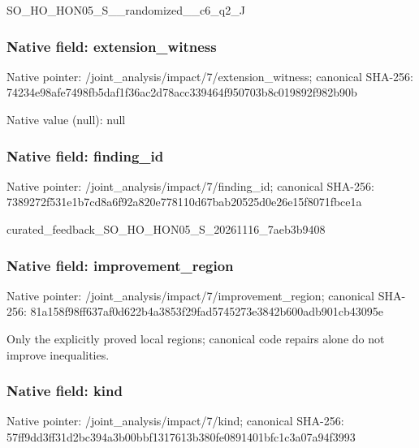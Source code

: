 \documentclass[10pt,a4paper]{article}
\begin{document}
\begingroup\raggedright\sloppy SO\_\allowbreak{}HO\_\allowbreak{}HON05\_\allowbreak{}S\_\allowbreak{}\_\allowbreak{}randomized\_\allowbreak{}\_\allowbreak{}c6\_\allowbreak{}q2\_\allowbreak{}J\par\endgroup

\subsubsection{Native field: extension\_\allowbreak{}witness}
Native pointer: /joint\_\allowbreak{}analysis/impact/7/extension\_\allowbreak{}witness; canonical SHA-256: 74234e98afe7498fb5daf1f36ac2d78acc339464f950703b8c019892f982b90b

Native value (null): null

\subsubsection{Native field: finding\_\allowbreak{}id}
Native pointer: /joint\_\allowbreak{}analysis/impact/7/finding\_\allowbreak{}id; canonical SHA-256: 7389272f531e1b7cd8a6f92a820e778110d67bab20525d0e26e15f8071fbce1a

\begingroup\raggedright\sloppy curated\_\allowbreak{}feedback\_\allowbreak{}SO\_\allowbreak{}HO\_\allowbreak{}HON05\_\allowbreak{}S\_\allowbreak{}20261116\_\allowbreak{}7aeb3b9408\par\endgroup

\subsubsection{Native field: improvement\_\allowbreak{}region}
Native pointer: /joint\_\allowbreak{}analysis/impact/7/improvement\_\allowbreak{}region; canonical SHA-256: 81a158f98ff637af0d622b4a3853f29fad5745273e3842b600adb901cb43095e

\begingroup\raggedright\sloppy Only the explicitly proved local regions;\allowbreak{} canonical code repairs alone do not improve inequalities.\par\endgroup

\subsubsection{Native field: kind}
Native pointer: /joint\_\allowbreak{}analysis/impact/7/kind; canonical SHA-256: 57ff9dd3ff31d2bc394a3b00bbf1317613b380fe0891401bfc1c3a07a94f3993
\end{document}
